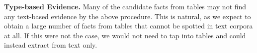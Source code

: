 \vspace{0.1cm}
\noindent \textbf{Type-based Evidence.}
%
Many of the candidate facts from tables may not find
any text-based evidence by the above procedure.
This is natural, as we expect to obtain a large
number of facts from tables that cannot be spotted
in text corpora at all. If this were not the case,
we would not need to tap into tables and could instead
extract from text only.


